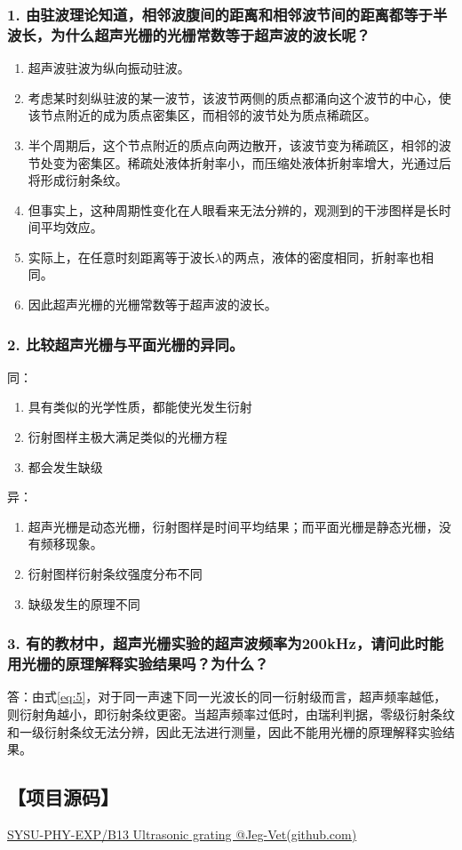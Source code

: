 \documentclass[12pt,a4paper,UTF8]{ctexart}
\begin{document}
	\subsubsection*{1. 由驻波理论知道，相邻波腹间的距离和相邻波节间的距离都等于半波长，为什么超声光栅的光栅常数等于超声波的波长呢？}
		\begin{enumerate}[label=\arabic*.]
			\item 超声波驻波为纵向振动驻波。
			\item 考虑某时刻纵驻波的某一波节，该波节两侧的质点都涌向这个波节的中心，使该节点附近的成为质点密集区，而相邻的波节处为质点稀疏区。
			\item 半个周期后，这个节点附近的质点向两边散开，该波节变为稀疏区，相邻的波节处变为密集区。稀疏处液体折射率小，而压缩处液体折射率增大，光通过后将形成衍射条纹。
			\item 但事实上，这种周期性变化在人眼看来无法分辨的，观测到的干涉图样是长时间平均效应。
			\item 实际上，在任意时刻距离等于波长$\lambda$的两点，液体的密度相同，折射率也相同。
			\item 因此超声光栅的光栅常数等于超声波的波长。
		\end{enumerate}
	\subsubsection*{2. 比较超声光栅与平面光栅的异同。}
		同：
		\begin{enumerate}[label=\arabic*.]
			\item 具有类似的光学性质，都能使光发生衍射
			\item 衍射图样主极大满足类似的光栅方程
			\item 都会发生缺级
		\end{enumerate}
		
		异：
		\begin{enumerate}[label=\arabic*.]
			\item 超声光栅是动态光栅，衍射图样是时间平均结果；而平面光栅是静态光栅，没有频移现象。
			\item 衍射图样衍射条纹强度分布不同
			\item 缺级发生的原理不同
		\end{enumerate}
	\subsubsection*{3. 有的教材中，超声光栅实验的超声波频率为200kHz，请问此时能用光栅的原理解释实验结果吗？为什么？}
		答：由式\ref{eq:5}，对于同一声速下同一光波长的同一衍射级而言，超声频率越低，则衍射角越小，即衍射条纹更密。当超声频率过低时，由瑞利判据，零级衍射条纹和一级衍射条纹无法分辨，因此无法进行测量，因此不能用光栅的原理解释实验结果。
\subsection*{【项目源码】}
\href{https://github.com/Jeg-Vet/SYSU-PHY-EXP/tree/main/B13-Ultrasonic_grating}{SYSU-PHY-EXP/B13 Ultrasonic grating @Jeg-Vet(github.com)}
\end{document}
